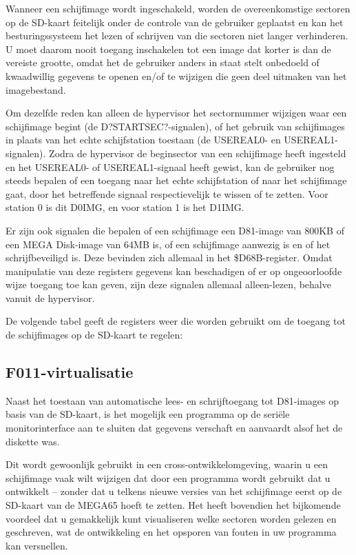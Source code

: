 Wanneer een schijfimage wordt ingeschakeld, worden de overeenkomstige sectoren op de SD-kaart feitelijk onder de controle van de gebruiker geplaatst en kan het besturingssysteem het lezen of schrijven van die sectoren niet langer verhinderen. U moet daarom nooit toegang inschakelen tot een image dat korter is dan de vereiste grootte, omdat het de gebruiker anders in staat stelt onbedoeld of kwaadwillig gegevens te openen en/of te wijzigen die geen deel uitmaken van het imagebestand.

Om dezelfde reden kan alleen de hypervisor het sectornummer wijzigen waar een schijfimage begint (de D?STARTSEC?-signalen), of het gebruik van schijfimages in plaats van het echte schijfstation toestaan (de USEREAL0- en USEREAL1-signalen). Zodra de hypervisor de beginsector van een schijfimage heeft ingesteld en het USEREAL0- of USEREAL1-signaal heeft gewist, kan de gebruiker nog steeds bepalen of een toegang naar het echte schijfstation of naar het schijfimage gaat, door het betreffende signaal respectievelijk te wissen of te zetten. Voor station 0 is dit D0IMG, en voor station 1 is het D1IMG.

Er zijn ook signalen die bepalen of een schijfimage een D81-image van 800KB of een MEGA Disk-image van 64MB is, of een schijfimage aanwezig is en of het schrijfbeveiligd is. Deze bevinden zich allemaal in het \$D68B-register. Omdat manipulatie van deze registers gegevens kan beschadigen of er op ongeoorloofde wijze toegang toe kan geven, zijn deze signalen allemaal alleen-lezen, behalve vanuit de hypervisor.

De volgende tabel geeft de registers weer die worden gebruikt om de toegang tot de schijfimages op de SD-kaart te regelen:



\subsection{F011-virtualisatie}

Naast het toestaan van automatische lees- en schrijftoegang tot D81-images op basis van de SD-kaart, is het mogelijk een programma op de seriële monitorinterface aan te sluiten dat gegevens verschaft en aanvaardt alsof het de diskette was.

Dit wordt gewoonlijk gebruikt in een cross-ontwikkelomgeving, waarin u een schijfimage vaak wilt wijzigen dat door een programma wordt gebruikt dat u ontwikkelt -- zonder dat u telkens nieuwe versies van het schijfimage eerst op de SD-kaart van de MEGA65 hoeft te zetten. Het heeft bovendien het bijkomende voordeel dat u gemakkelijk kunt visualiseren welke sectoren worden gelezen en geschreven, wat de ontwikkeling en het opsporen van fouten in uw programma kan versnellen.


